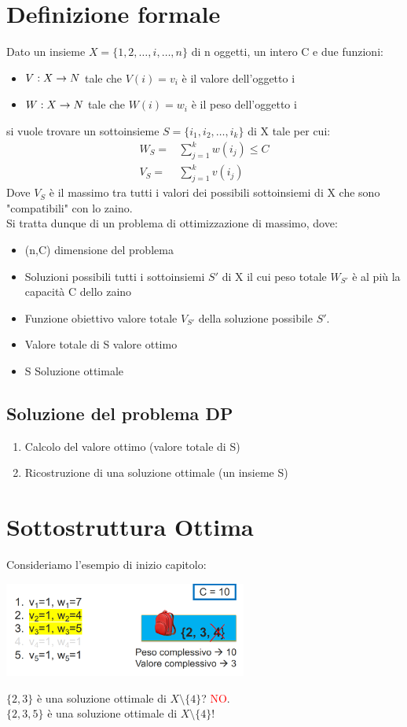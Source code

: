 \section{Definizione formale}
Dato un insieme $X=\{1,2,\dots,i,\dots,n\}$ di n oggetti, un intero C e due funzioni:
\begin{itemize}
    \item $V:X \rightarrow N$ tale che $V(i) = v_i$ è il valore dell'oggetto i
    \item $W:X \rightarrow N$ tale che $W(i)=w_i$ è il peso dell'oggetto i
\end{itemize}
si vuole trovare un sottoinsieme $S=\{i_1,i_2,\dots, i_k\}$ di X tale per cui:
\begin{align*}
    W_S=&\sum^k_{j=1}w(i_j) \leq C\\
    V_S=&\sum^k_{j=1}v(i_j)
\end{align*}
Dove $V_S$ è il massimo tra tutti i valori dei possibili sottoinsiemi di X che sono "compatibili" con lo zaino.\\
Si tratta dunque di un problema di ottimizzazione di massimo, dove:
\begin{itemize}
    \item (n,C) \ra dimensione del problema
    \item Soluzioni possibili \ra tutti i sottoinsiemi $S'$ di X il cui peso totale $W_{S'}$ è al più la capacità C
    dello zaino
    \item Funzione obiettivo \ra valore totale $V_{S'}$ della soluzione possibile $S'$.
    \item Valore totale di S \ra valore ottimo
    \item S \ra Soluzione ottimale
\end{itemize}
\subsection{Soluzione del problema DP}
\begin{enumerate}
    \item Calcolo del valore ottimo (valore totale di S)
    \item Ricostruzione di una soluzione ottimale (un insieme S)
\end{enumerate}
\section{Sottostruttura Ottima}
Consideriamo l'esempio di inizio capitolo:
\begin{center}
    \includegraphics[width=80mm, scale=0.5]{chapters_ulerich/img/knapsack_ricerca_sott_ott.png}
\end{center}
$\{2,3\}$ è una soluzione ottimale di $X \setminus \{4\}$? \textcolor{red}{NO}.\\
$\{2,3, 5\}$ è una soluzione ottimale di $X \setminus \{4\}$!\\
